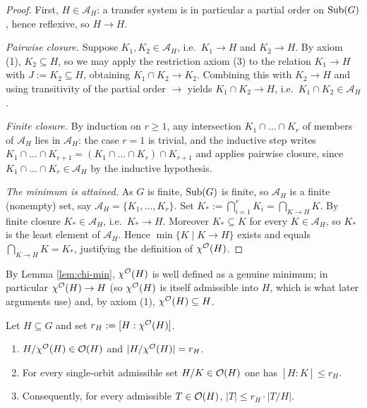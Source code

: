 \begin{proof}
First, $H\in\mathcal A_H$: a transfer system is in particular a partial order on
$\operatorname{Sub}(G)$, hence reflexive, so $H\to H$.

\emph{Pairwise closure.} Suppose $K_1,K_2\in\mathcal A_H$, i.e.\ $K_1\to H$ and
$K_2\to H$. By axiom (1), $K_2\subseteq H$, so we may apply the restriction
axiom (3) to the relation $K_1\to H$ with $J:=K_2\subseteq H$, obtaining
$K_1\cap K_2\to K_2$. Combining this with $K_2\to H$ and using transitivity of
the partial order $\to$ yields $K_1\cap K_2\to H$, i.e.\ $K_1\cap
K_2\in\mathcal A_H$.

\emph{Finite closure.} By induction on $r\ge 1$, any intersection
$K_1\cap\dots\cap K_r$ of members of $\mathcal A_H$ lies in $\mathcal A_H$: the
case $r=1$ is trivial, and the inductive step writes
$K_1\cap\dots\cap K_{r+1}=(K_1\cap\dots\cap K_r)\cap K_{r+1}$ and applies pairwise
closure, since $K_1\cap\dots\cap K_r\in\mathcal A_H$ by the inductive hypothesis.

\emph{The minimum is attained.} As $G$ is finite, $\operatorname{Sub}(G)$ is finite, so
$\mathcal A_H$ is a finite (nonempty) set, say $\mathcal A_H=\{K_1,\dots,K_r\}$.
Set $K_\ast:=\bigcap_{i=1}^r K_i=\bigcap_{K\to H}K$. By finite closure
$K_\ast\in\mathcal A_H$, i.e.\ $K_\ast\to H$. Moreover $K_\ast\subseteq K$ for
every $K\in\mathcal A_H$, so $K_\ast$ is the least element of $\mathcal A_H$.
Hence $\min\{K\mid K\to H\}$ exists and equals $\bigcap_{K\to H}K=K_\ast$,
justifying the definition of $\chi^{\mathcal{O}}(H)$.
\end{proof}

By Lemma \ref{lem:chi-min}, $\chi^{\mathcal{O}}(H)$ is well defined as a genuine
minimum; in particular $\chi^{\mathcal{O}}(H)\to H$ (so $\chi^{\mathcal{O}}(H)$ is itself
admissible into $H$, which is what later arguments use) and, by axiom (1),
$\chi^{\mathcal{O}}(H)\subseteq H$.

\begin{qfivelemma}\label{lem:index}
Let $H\subseteq G$ and set $r_H:=[H:\chi^{\mathcal{O}}(H)]$.
\begin{enumerate}\setlength\itemsep{2pt}
\item $H/\chi^{\mathcal{O}}(H)\in\mathcal{O}(H)$ and $|H/\chi^{\mathcal{O}}(H)|=r_H$.
\item For every single-orbit admissible set $H/K\in\mathcal{O}(H)$ one has $[H:K]\le r_H$.
\item Consequently, for every admissible $T\in\mathcal{O}(H)$, $|T|\le r_H\cdot|T/H|$.
\end{enumerate}
\end{qfivelemma}

